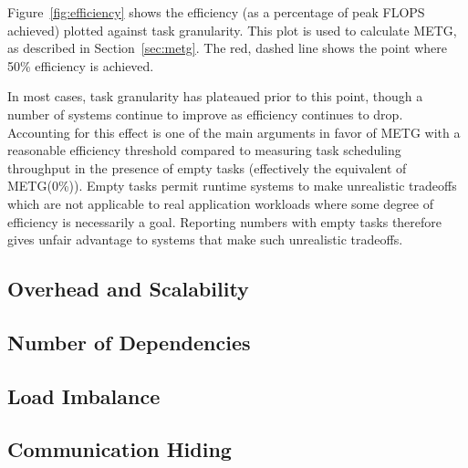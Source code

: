 Figure~\ref{fig:efficiency} shows the efficiency (as a percentage of
peak FLOPS achieved) plotted against task granularity. This plot is
used to calculate METG, as described in Section~\ref{sec:metg}. The
red, dashed line shows the point where 50\% efficiency is achieved.

In most cases, task granularity has plateaued prior to this point,
though a number of systems continue to improve as efficiency continues
to drop. Accounting for this effect is one of the main arguments in
favor of METG with a reasonable efficiency threshold compared to
measuring task scheduling throughput in the presence of empty tasks
(effectively the equivalent of METG(0\%)). Empty tasks permit runtime
systems to make unrealistic tradeoffs which are not applicable to real
application workloads where some degree of efficiency is necessarily a
goal. Reporting numbers with empty tasks therefore gives unfair
advantage to systems that make such unrealistic tradeoffs.

\subsection{Overhead and Scalability}



\subsection{Number of Dependencies}

\subsection{Load Imbalance}

\subsection{Communication Hiding}
